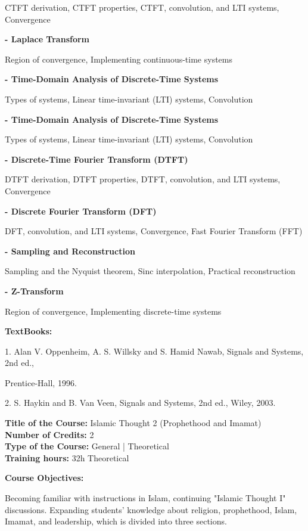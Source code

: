 \documentclass[12pt,a4paper]{article}
\begin{document}
CTFT derivation, CTFT properties, CTFT, convolution, and LTI systems, Convergence\par
\vspace{2pt}\textbf{- Laplace Transform}\par
Region of convergence, Implementing continuous-time systems\par
\vspace{2pt}\textbf{- Time-Domain Analysis of Discrete-Time Systems}\par
Types of systems, Linear time-invariant (LTI) systems, Convolution\par
\vspace{2pt}\textbf{- Time-Domain Analysis of Discrete-Time Systems}\par
Types of systems, Linear time-invariant (LTI) systems, Convolution\par
\vspace{2pt}\textbf{- Discrete-Time Fourier Transform (DTFT)}\par
DTFT derivation, DTFT properties, DTFT, convolution, and LTI systems, Convergence\par
\vspace{2pt}\textbf{- Discrete Fourier Transform (DFT)}\par
DFT, convolution, and LTI systems, Convergence, Fast Fourier Transform (FFT)\par
\vspace{2pt}\textbf{- Sampling and Reconstruction}\par
Sampling and the Nyquist theorem, Sinc interpolation, Practical reconstruction\par
\vspace{2pt}\textbf{- Z-Transform}\par
Region of convergence, Implementing discrete-time systems\par\vspace{4pt}
\textbf{TextBooks:}\par\vspace{2pt}
1. Alan V. Oppenheim, A. S. Willsky and S. Hamid Nawab, Signals and Systems, 2nd ed.,\par
Prentice-Hall, 1996.\par
2. S. Haykin and B. Van Veen, Signals and Systems, 2nd ed., Wiley, 2003.\par
\vspace{4pt}

\newpage
\nopagebreak
\textbf{Title of the Course:} Islamic Thought 2 (Prophethood and Imamat)\\
\textbf{Number of Credits:} 2\\
\textbf{Type of the Course:} General | Theoretical\\
\textbf{Training hours:} 32h Theoretical\par\vspace{4pt}
\textbf{Course Objectives:}\par\vspace{2pt}
Becoming familiar with instructions in Islam, continuing "Islamic Thought I" discussions.
Expanding students' knowledge about religion, prophethood, Islam, Imamat, and leadership,
which is divided into three sections.\par\vspace{4pt}
\end{document}
